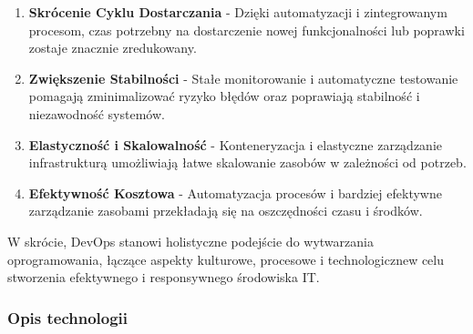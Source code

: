 
\begin{enumerate}
\item {\bf Skrócenie Cyklu Dostarczania}
   - Dzięki automatyzacji i zintegrowanym procesom, czas potrzebny na dostarczenie nowej funkcjonalności lub poprawki zostaje znacznie zredukowany.

\item {\bf Zwiększenie Stabilności}
   - Stałe monitorowanie i automatyczne testowanie pomagają zminimalizować ryzyko błędów oraz poprawiają stabilność i niezawodność systemów.

\item {\bf Elastyczność i Skalowalność}
   - Konteneryzacja i elastyczne zarządzanie infrastrukturą umożliwiają łatwe skalowanie zasobów w zależności od potrzeb.

\item {\bf Efektywność Kosztowa}
   - Automatyzacja procesów i bardziej efektywne zarządzanie zasobami przekładają się na oszczędności czasu i środków.
\end{enumerate}

W skrócie, DevOps stanowi holistyczne podejście do wytwarzania oprogramowania, łączące aspekty kulturowe, procesowe i technologiczne\linebreak w celu stworzenia efektywnego i responsywnego środowiska IT.

\subsubsection{Opis technologii}

